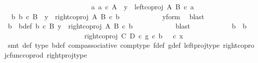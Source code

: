 \begin{isabellebody}
\ \ \ \ \ \ \ \ \isamarkupfalse%
\isanewline
\ \ \ \ \ \ \isamarkupfalse%
\isanewline
\ \ \ \ \ \ \ \ \isamarkupfalse%
\ {\isachardoublequoteopen}{\isasymnexists}a{\isachardot}{\kern0pt}\ a\ {\isasymin}\isactrlsub c\ A\ {\isasymand}\ y\ {\isacharequal}{\kern0pt}\ left{\isacharunderscore}{\kern0pt}coproj\ A\ B\ {\isasymcirc}\isactrlsub c\ a{\isachardoublequoteclose}\isanewline
\ \ \ \ \ \ \ \ \isamarkupfalse%
\ \isamarkupfalse%
\ {\isachardoublequoteopen}{\isasymexists}\ b{\isachardot}{\kern0pt}\ b\ {\isasymin}\isactrlsub c\ B\ {\isasymand}\ y\ {\isacharequal}{\kern0pt}\ right{\isacharunderscore}{\kern0pt}coproj\ A\ B\ {\isasymcirc}\isactrlsub c\ b{\isachardoublequoteclose}\isanewline
\ \ \ \ \ \ \ \ \ \ \isamarkupfalse%
\ y{\isacharunderscore}{\kern0pt}form\ \isamarkupfalse%
\ blast\isanewline
\ \ \ \ \ \ \ \ \isamarkupfalse%
\ \isamarkupfalse%
\ b{\isacharprime}{\kern0pt}\ \ b{\isacharprime}{\kern0pt}{\isacharunderscore}{\kern0pt}def{\isacharcolon}{\kern0pt}\ {\isachardoublequoteopen}b{\isacharprime}{\kern0pt}\ {\isasymin}\isactrlsub c\ B{\isachardoublequoteclose}\ {\isachardoublequoteopen}y\ {\isacharequal}{\kern0pt}\ right{\isacharunderscore}{\kern0pt}coproj\ A\ B\ {\isasymcirc}\isactrlsub c\ b{\isacharprime}{\kern0pt}{\isachardoublequoteclose}\isanewline
\ \ \ \ \ \ \ \ \ \ \isamarkupfalse%
\ blast\isanewline
\ \ \ \ \ \ \ \ \isamarkupfalse%
\ \isamarkupfalse%
\ {\isachardoublequoteopen}b\ {\isacharequal}{\kern0pt}\ b{\isacharprime}{\kern0pt}{\isachardoublequoteclose}\isanewline
\ \ \ \ \ \ \ \ \isamarkupfalse%
\ {\isacharminus}{\kern0pt}\ \isanewline
\ \ \ \ \ \ \ \ \ \ \isamarkupfalse%
\ {\isachardoublequoteopen}{\isacharparenleft}{\kern0pt}right{\isacharunderscore}{\kern0pt}coproj\ C\ D\ {\isasymcirc}\isactrlsub c\ g{\isacharparenright}{\kern0pt}\ {\isasymcirc}\isactrlsub c\ b\ {\isacharequal}{\kern0pt}\ {\isasymphi}\ {\isasymcirc}\isactrlsub c\ x{\isachardoublequoteclose}\isanewline
\ \ \ \ \ \ \ \ \ \ \ \ \isamarkupfalse%
\ {\isacharparenleft}{\kern0pt}smt\ {\isasymphi}{\isacharunderscore}{\kern0pt}def\ {\isasymphi}{\isacharunderscore}{\kern0pt}type\ b{\isacharunderscore}{\kern0pt}def\ comp{\isacharunderscore}{\kern0pt}associative{}\ comp{\isacharunderscore}{\kern0pt}type\ f{\isacharunderscore}{\kern0pt}def{\isacharparenleft}{\kern0pt}{}{\isacharparenright}{\kern0pt}\ g{\isacharunderscore}{\kern0pt}def{\isacharparenleft}{\kern0pt}{}{\isacharparenright}{\kern0pt}\ left{\isacharunderscore}{\kern0pt}proj{\isacharunderscore}{\kern0pt}type\ right{\isacharunderscore}{\kern0pt}coproj{\isacharunderscore}{\kern0pt}cfunc{\isacharunderscore}{\kern0pt}coprod\ right{\isacharunderscore}{\kern0pt}proj{\isacharunderscore}{\kern0pt}type{\isacharparenright}{\kern0pt}\isanewline

\end{isabellebody}

